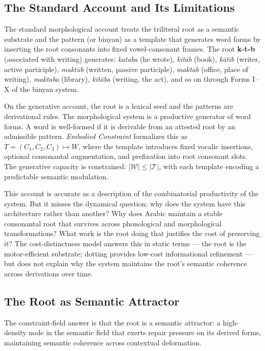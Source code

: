 \documentclass[11pt, a4paper]{article}
\theoremstyle{definition}
\theoremstyle{remark}
\begin{document}
\subsection{The Standard Account and Its Limitations}

The standard morphological account treats the triliteral root as a semantic
substrate and the pattern (or binyan) as a template that generates word forms
by inserting the root consonants into fixed vowel-consonant frames. The root
\textbf{k-t-b} (associated with writing) generates: \textit{kataba} (he wrote),
\textit{kit\={a}b} (book), \textit{k\={a}tib} (writer, active participle),
\textit{makt\={u}b} (written, passive participle), \textit{maktab} (office,
place of writing), \textit{maktaba} (library), \textit{kit\={a}ba} (writing,
the act), and so on through Forms I--X of the binyan system.

On the generative account, the root is a lexical seed and the patterns are
derivational rules. The morphological system is a productive generator of
word forms. A word is well-formed if it is derivable from an attested root
by an admissible pattern. \textit{Embodied Constraint} formalizes this
as $T = (C_1, C_2, C_3) \mapsto W$, where the template introduces fixed
vocalic insertions, optional consonantal augmentation, and prefixation into
root consonant slots. The generative capacity is constrained:
$|\mathcal{W}| \leq |\mathcal{T}|$, with each template encoding a predictable
semantic modulation.

This account is accurate as a description of the combinatorial productivity
of the system. But it misses the dynamical question: why does the system
have this architecture rather than another? Why does Arabic maintain a stable
consonantal root that survives across phonological and morphological
transformations? What work is the root doing that justifies the cost of
preserving it? The cost-distinctness model answers this in static terms ---
the root is the motor-efficient substrate; dotting provides low-cost
informational refinement --- but does not explain why the system maintains
the root's semantic coherence across derivations over time.

\subsection{The Root as Semantic Attractor}

The constraint-field answer is that the root is a semantic attractor: a high-
density node in the semantic field that exerts repair pressure on its derived
forms, maintaining semantic coherence across contextual deformation.
\end{document}
